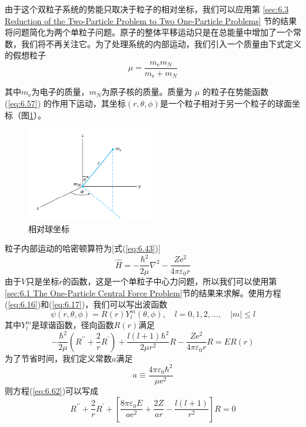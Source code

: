     由于这个双粒子系统的势能只取决于粒子的相对坐标，我们可以应用第 \ref{sec:6.3 Reduction of the Two-Particle Problem to Two One-Particle Problems} 节的结果将问题简化为两个单粒子问题。原子的整体平移运动只是在总能量中增加了一个常数，我们将不再关注它。为了处理系统的内部运动，我们引入一个质量由下式定义的假想粒子
    \begin{equation}
        \mu = \frac{m_{\mathrm{e}}m_N}{m_{\mathrm{e}} + m_N}
        \label{eq:6.59}
    \end{equation}

   其中$m_{\mathrm{e}}$为电子的质量，$m_N$为原子核的质量。质量为 $\mu$ 的粒子在势能函数 (\ref{eq:6.57}) 的作用下运动，其坐标$\left(r,\theta,\phi\right)$是一个粒子相对于另一个粒子的球面坐标（图\ref{fig:6.5}）。
   \begin{figure}
       \centering
       \includegraphics[width=0.5\textwidth]{Figures/6.5.png}
       \caption{相对球坐标}
       \label{fig:6.5}
   \end{figure}

   粒子内部运动的哈密顿算符为[式(\ref{eq:6.43})]
   \begin{equation}
        \hat{H} = -\frac{\hbar^2}{2\mu}\nabla^2 - \frac{Z\mathrm{e}^2}{4\pi\varepsilon_0r}
        \label{eq:6.60}
   \end{equation}
   由于$V$只是坐标$r$的函数，这是一个单粒子中心力问题，所以我们可以使用第\ref{sec:6.1 The One-Particle Central Force Problem}节的结果来求解。使用方程(\ref{eq:6.16})和(\ref{eq:6.17})，我们可以写出波函数
   \begin{equation}
        \psi\left(r,\theta,\phi\right) = R\left(r\right)Y_l^m\left(\theta,\phi\right), \quad l = 0, 1, 2, \ldots, \quad \left|m\right| \leq l
    \label{eq:6.61}
   \end{equation}
   其中$Y_l^m$是球谐函数，径向函数$R\left(r\right)$满足
   \begin{equation}
        -\frac{\hbar^2}{2\mu}\left(R^{\prime\prime} + \frac{2}{r}R^{\prime}\right) + \frac{l\left(l+1\right)\hbar^2}{2\mu r^2}R - \frac{Z\mathrm{e}^2}{4\pi\varepsilon_0r}R = ER\left(r\right)
        \label{eq:6.62}
   \end{equation}
   为了节省时间，我们定义常数$a$满足
   \begin{equation}
        a \equiv \frac{4\pi\varepsilon_0\hbar^2}{\mu \mathrm{e}^2}
        \label{eq:6.63}
   \end{equation}
   则方程(\ref{eq:6.62})可以写成
   \begin{equation}
        R^{\prime\prime} + \frac{2}{r}R^{\prime} + \left[\frac{8\pi\varepsilon_0E}{a\mathrm{e}^2} + \frac{2Z}{ar} - \frac{l\left(l+1\right)}{r^2}\right]R = 0
        \label{eq:6.64}
   \end{equation}

